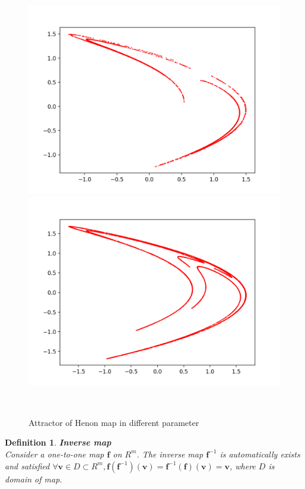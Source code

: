 \documentclass[12pt]{article}
\theoremstyle{plain}
\newtheorem{definition}{\textbf{Definition}}[section]
\begin{document}
\begin{figure}[H]
\begin{minipage}[c][0.32\width]{0.32\textwidth}
   \includegraphics[width=\textwidth]{figure/section2/Henon-attractor-1*045-0*4.png}
\end{minipage}
\begin{minipage}[c][0.32\width]{0.32\textwidth}
   \centering
   \includegraphics[width=\textwidth]{figure/section2/Henon-attractor-1*2-0*4.png}
\end{minipage}
\\[4ex]\caption{Attractor of Henon map in different parameter}\label{attractor-Henon-map}
\end{figure}


\begin{definition}\textbf{Inverse map}
\\\noindent Consider a one-to-one map $\mathbf f$ on $R^m$. The inverse map $\mathbf f^{-1}$ is automatically exists and satisfied $\forall \mathbf v \in D \subset R^m, \mathbf f(\mathbf f^{-1})(\mathbf v) = \mathbf f^{-1}(\mathbf f)(\mathbf v) = \mathbf v$, where $D$ is domain of map.
\end{definition}
\end{document}
